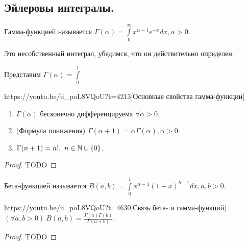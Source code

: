 \subsection{Эйлеровы интегралы.}
\begin{Def}
	Гамма-функцией называется $\Gamma(\alpha)=\int\limits_0^\infty x^{\alpha-1}e^{-x}dx, \alpha>0$.
\end{Def}
Это несобственный интеграл, убедимся, что он действительно определен.

Представим $\Gamma(\alpha) = \int\limits_0^1$

\begin{linkthm}{https://youtu.be/ii_poL8VQoU?t=4213}[Основные свойства гамма-функции]\ \\
	\begin{enumerate}
		\item $\Gamma(\alpha)$ бесконечно дифференцируема $\forall\alpha>0$.
		\item (Формула понижения) $\Gamma(\alpha+1)=\alpha\Gamma(\alpha), \alpha>0$.
		\item $\Gamma(n+1)=n!,\ n\in\N\cup\{0\}$.
	\end{enumerate}
\end{linkthm}

\begin{proof}
TODO
\end{proof}

\begin{Def}
	Бета-функцией называется $B(a,b)=\int\limits_0^1 x^{\alpha-1}(1-x)^{b-1}dx, a,b>0$.
\end{Def}

\begin{linkthm}{https://youtu.be/ii_poL8VQoU?t=4630}[Связь бета- и гамма-функций]\ \\
	$(\forall a,b>0)\ B(a,b)=\frac{\Gamma(a)\Gamma(b)}{\Gamma(a+b)}$.
\end{linkthm}
\begin{proof}
	TODO
\end{proof}













